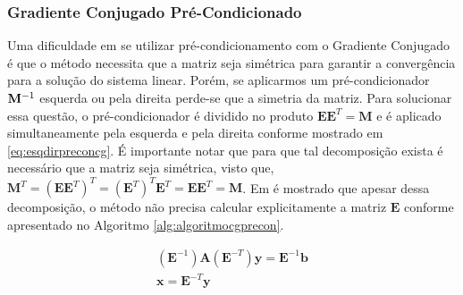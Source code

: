 \subsubsection{Gradiente Conjugado Pré-Condicionado}


Uma dificuldade em se utilizar pré-condicionamento com o Gradiente Conjugado é que o método necessita que a matriz seja simétrica para garantir a convergência para a solução do sistema linear. Porém, se aplicarmos um pré-condicionador $\mathbf{M}^{-1}$ esquerda ou pela direita perde-se que a simetria da matriz. Para solucionar essa questão, o pré-condicionador é dividido no produto $\mathbf{E}\mathbf{E}^T = \mathbf{M}$ e é aplicado simultaneamente pela esquerda e pela direita conforme mostrado em \eqref{eq:esqdirpreconcg}. É importante notar que para que tal decomposição exista é necessário que a matriz seja simétrica, visto que, $\mathbf{M}^T = (\mathbf{E}\mathbf{E}^T)^T = (\mathbf{E}^T)^T \mathbf{E}^T = \mathbf{E}\mathbf{E}^T = \mathbf{M}$. Em \citet{Shewchuk94anintroduction} é mostrado que apesar  dessa decomposição, o método não precisa calcular explicitamente a matriz $\mathbf{E}$ conforme apresentado no Algoritmo \ref{alg:algoritmocgprecon}.


\begin{align} \label{eq:esqdirpreconcg}
(\mathbf{E}^{-1})\mathbf{A}(\mathbf{E}^{-T}) \mathbf{y} = \mathbf{E}^{-1}\mathbf{b} \\
\mathbf{x} = \mathbf{E}^{-T} \mathbf{y}
\end{align}






